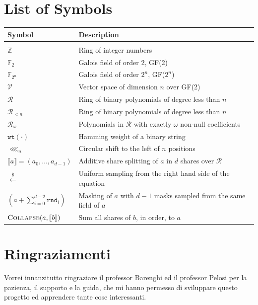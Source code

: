 \documentclass{Configuration_Files/PoliMi3i_thesis}
\theoremstyle{definition}
\theoremstyle{remark}
\newcommand{\sample}{\ensuremath{ \stackrel{\$}{\gets} }}
\newcommand{\ssplit}[1]{\ensuremath{ \llbracket #1 \rrbracket }}
\newcommand{\clshift}{\ensuremath{\lll_n}}
\begin{document}
\listoffigures

\listoftables

\listofalgorithms
\lstlistoflistings

\chapter*{List of Symbols} %
\begin{table}[H]
    \centering
    \begin{tabular}{ll}
        \textbf{Symbol} & \textbf{Description}\\\hline\\[-9px]
        $\mathds{Z}$ & Ring of integer numbers \\[2px]
        $\mathds{F}_2$ & Galois field of order 2, GF(2) \\[2px]
        $\mathds{F}_{2^n}$ & Galois field of order $2^n$, GF($2^n$) \\[2px]
        $\mathcal{V}$ & Vector space of dimension $n$ over GF(2) \\[2px]
        $\mathcal{R}$ & Ring of binary polynomials of degree less than $n$ \\[2px] 
        $\mathcal{R}_{<n}$ & Ring of binary polynomials of degree less than $n$ \\[2px]
        $\mathcal{R}_{\omega}$ & Polynomials in $\mathcal{R}$ with exactly $\omega$ non-null coefficients \\[2px]
        $\texttt{wt}(\cdot)$ & Hamming weight of a binary string \\[2px]
        $\clshift$ & Circular shift to the left of $n$ positions \\[2px]
        $\ssplit{a} = (a_0,\ldots,a_{d-1})$ & Additive share splitting of $a$ in $d$ shares over $\mathcal{R}$ \\[2px]
        $\sample$ & Uniform sampling from the right hand side of the equation \\[2px]
        $(a+\sum_{i=0}^{d-2} \mathtt{rnd}_i)$ & Masking of $a$ with $d-1$ masks sampled from the same field of $a$ \\[2px]
        $\textsc{Collapse}(a, \ssplit{b})$ & Sum all shares of $b$, in order, to $a$ 
    \end{tabular}
\end{table}

\chapter*{Ringraziamenti}
Vorrei innanzitutto ringraziare il professor Barenghi ed il professor Pelosi per la pazienza, il supporto
e la guida, che mi hanno permesso di sviluppare questo progetto ed apprendere tante cose interessanti.
\end{document}
